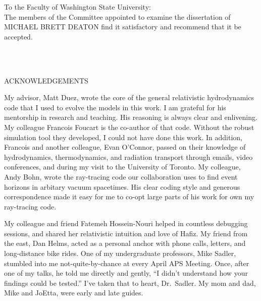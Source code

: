 \documentclass[12pt]{report}
\begin{document}
\begin{singlespace}
  \noindent
  \vspace{1.5in}

  \noindent To the Faculty of Washington State University:\\
  
  The members of the Committee appointed to examine the dissertation of
  \uppercase{Michael Brett Deaton}
  find it satisfactory and recommend that it be accepted.
  
  \begin{flushright}
    \\
    \\
  \end{flushright}
\end{singlespace}
\newpage

\begin{center}
  \uppercase{Acknowledgements}
\end{center}

  \bigskip
  My advisor, Matt Duez, wrote the core of the general relativistic hydrodynamics
  code that I used to evolve the models in this work. I am grateful for his
  mentorship in research and teaching. His reasoning is always clear and
  enlivening. My colleague Francois Foucart is the co-author of that code.
  Without the robust simulation tool they developed, I could not have done this
  work. In addition, Francois and another colleague, Evan O'Connor, passed on
  their knowledge of hydrodynamics, thermodynamics, and radiation transport
  through emails, video conferences, and during my visit to the University of
  Toronto. My colleague, Andy Bohn, wrote the ray-tracing code our collaboration
  uses to find event horizons in arbitary vacuum spacetimes. His clear coding
  style and generous correspondence made it easy for me to co-opt large parts of
  his work for own my ray-tracing code.

  My colleague and friend Fatemeh Hossein-Nouri helped in countless debugging
  sessions, and shared her relativistic intuition and love of Hafiz.
  My friend from the east, Dan Helms, acted as a personal anchor with phone
  calls, letters, and long-distance bike rides.
  One of my undergraduate professors, Mike Sadler, stumbled into me
  not-quite-by-chance at every April APS Meeting. Once, after one of my talks,
  he told me directly and gently, ``I didn't understand how your findings could
  be tested.'' I've taken that to heart, Dr.\ Sadler.
  My mom and dad, Mike and JoEtta, were early and late guides.
\end{document}
